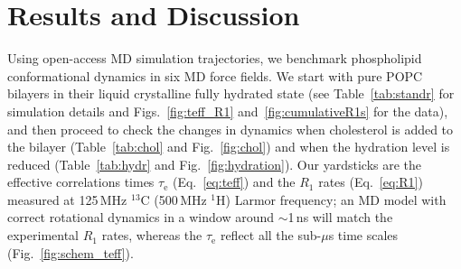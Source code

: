 \documentclass[journal=jcisd8,manuscript=article,layout=twocolumn]{achemso}
\begin{document}
\section{Results and Discussion}

Using open-access MD simulation trajectories,
we benchmark phospholipid conformational  dynamics in six
MD force fields. %
We start with
pure POPC bilayers in their liquid crystalline fully hydrated state
(see Table~\ref{tab:standr} for simulation details and Figs.~\ref{fig:teff_R1} and~\ref{fig:cumulativeR1s} for the data), and
then proceed to
check the changes in dynamics when cholesterol is added to the bilayer (Table~\ref{tab:chol} and Fig.~\ref{fig:chol}) and when the hydration level is reduced (Table~\ref{tab:hydr} and Fig.~\ref{fig:hydration}).
Our yardsticks are
the effective correlations times $\tau_\mathrm e$ (Eq.~\eqref{eq:teff}) and
the $R_1$ rates (Eq.~\eqref{eq:R1})
measured at 125\,MHz $^{13}$C (500\,MHz $^1$H) Larmor frequency;
an MD model with correct rotational dynamics in a window around $\sim$1\,ns
will match the experimental $R_1$ rates, whereas
the $\tau_\mathrm{e}$ reflect all the sub-$\mu$s time scales (Fig.~\ref{fig:schem_teff}).



\end{document}
